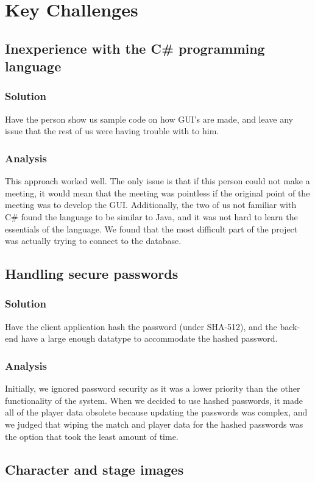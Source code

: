 \documentclass{article}
\begin{document}
\section{Key Challenges}
\subsection{Inexperience with the C\# programming language}
\subsubsection{Solution}
Have the person show us sample code on how GUI's are made, and leave any issue that the rest of us were having trouble with to him.
\subsubsection{Analysis}
This approach worked well. The only issue is that if this person could not make a meeting, it would mean that the meeting was pointless if the original point of the meeting was to develop the GUI. Additionally, the two of us not familiar with C\# found the language to be similar to Java, and it was not hard to learn the essentials of the language. We found that the most difficult part of the project was actually trying to connect to the database.
\subsection{Handling secure passwords}
\subsubsection{Solution}
Have the client application hash the password (under SHA-512), and the back-end have a large enough datatype to accommodate the hashed password.
\subsubsection{Analysis}
Initially, we ignored password security as it was a lower priority than the other functionality of the system. When we decided to use hashed passwords, it made all of the player data obsolete because updating the passwords was complex, and we judged that wiping the match and player data for the hashed passwords was the option that took the least amount of time.
\subsection{Character and stage images}
\end{document}

